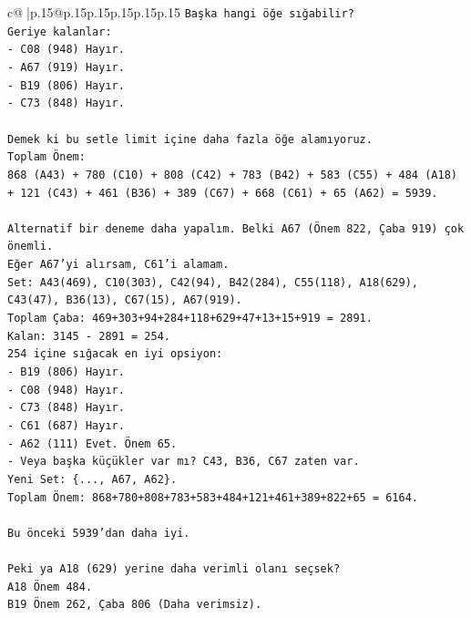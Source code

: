 \documentclass{article}
\begin{document}
{\begin{supertabular}{c@{$\;$}|p{.15\linewidth}@{}p{.15\linewidth}p{.15\linewidth}p{.15\linewidth}p{.15\linewidth}p{.15\linewidth}}
{{{\texttt{Başka hangi öğe sığabilir?} \\
\texttt{Geriye kalanlar:} \\
\texttt{{-} C08 (948) Hayır.} \\
\texttt{{-} A67 (919) Hayır.} \\
\texttt{{-} B19 (806) Hayır.} \\
\texttt{{-} C73 (848) Hayır.} \\
\\ 
\texttt{Demek ki bu setle limit içine daha fazla öğe alamıyoruz.} \\
\texttt{Toplam Önem:} \\
\texttt{868 (A43) + 780 (C10) + 808 (C42) + 783 (B42) + 583 (C55) + 484 (A18) + 121 (C43) + 461 (B36) + 389 (C67) + 668 (C61) + 65 (A62) = 5939.} \\
\\ 
\texttt{Alternatif bir deneme daha yapalım. Belki A67 (Önem 822, Çaba 919) çok önemli.} \\
\texttt{Eğer A67'yi alırsam, C61'i alamam.} \\
\texttt{Set: A43(469), C10(303), C42(94), B42(284), C55(118), A18(629), C43(47), B36(13), C67(15), A67(919).} \\
\texttt{Toplam Çaba: 469+303+94+284+118+629+47+13+15+919 = 2891.} \\
\texttt{Kalan: 3145 {-} 2891 = 254.} \\
\texttt{254 içine sığacak en iyi opsiyon:} \\
\texttt{{-} B19 (806) Hayır.} \\
\texttt{{-} C08 (948) Hayır.} \\
\texttt{{-} C73 (848) Hayır.} \\
\texttt{{-} C61 (687) Hayır.} \\
\texttt{{-} A62 (111) Evet. Önem 65.} \\
\texttt{{-} Veya başka küçükler var mı? C43, B36, C67 zaten var.} \\
\texttt{Yeni Set: \{..., A67, A62\}.} \\
\texttt{Toplam Önem: 868+780+808+783+583+484+121+461+389+822+65 = 6164.} \\
\\ 
\texttt{Bu önceki 5939'dan daha iyi.} \\
\\ 
\texttt{Peki ya A18 (629) yerine daha verimli olanı seçsek?} \\
\texttt{A18 Önem 484.} \\
\texttt{B19 Önem 262, Çaba 806 (Daha verimsiz).} \\
}}}
\end{supertabular}}
\end{document}
